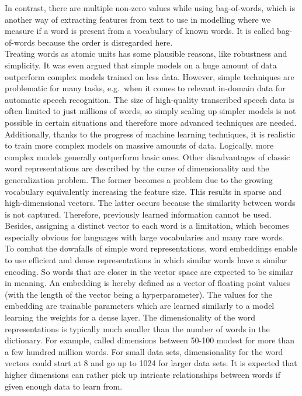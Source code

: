 \documentclass[
]{krantz}
\begin{document}
In contrast, there are multiple non-zero values while using
bag-of-words, which is another way of extracting features from text to
use in modelling where we measure if a word is present from a vocabulary
of known words. It is called bag-of-words because the order is
disregarded here.\\
Treating words as atomic units has some plausible reasons, like
robustness and simplicity. It was even argued that simple models on a
huge amount of data outperform complex models trained on less data.
However, simple techniques are problematic for many tasks, e.g.~when it
comes to relevant in-domain data for automatic speech recognition. The
size of high-quality transcribed speech data is often limited to just
millions of words, so simply scaling up simpler models is not possible
in certain situations and therefore more advanced techniques are needed.
Additionally, thanks to the progress of machine learning techniques, it
is realistic to train more complex models on massive amounts of data.
Logically, more complex models generally outperform basic ones. Other
disadvantages of classic word representations are described by the curse
of dimensionality and the generalization problem. The former becomes a
problem due to the growing vocabulary equivalently increasing the
feature size. This results in sparse and high-dimensional vectors. The
latter occurs because the similarity between words is not captured.
Therefore, previously learned information cannot be used. Besides,
assigning a distinct vector to each word is a limitation, which becomes
especially obvious for languages with large vocabularies and many rare
words.\\
To combat the downfalls of simple word representations, word embeddings
enable to use efficient and dense representations in which similar words
have a similar encoding. So words that are closer in the vector space
are expected to be similar in meaning. An embedding is hereby defined as
a vector of floating point values (with the length of the vector being a
hyperparameter). The values for the embedding are trainable parameters
which are learned similarly to a model learning the weights for a dense
layer. The dimensionality of the word representations is typically much
smaller than the number of words in the dictionary. For example,
\citep{mikolov2013efficient} called dimensions between 50-100 modest for more than a
few hundred million words. For small data sets, dimensionality for the
word vectors could start at 8 and go up to 1024 for larger data sets. It
is expected that higher dimensions can rather pick up intricate
relationships between words if given enough data to learn from.
\end{document}
